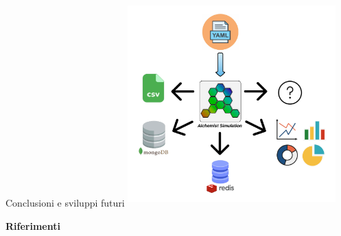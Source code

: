 \documentclass{beamer}
\begin{document}
\begin{frame}{Conclusioni e sviluppi futuri}
\hfil\hfil\includegraphics[width=8cm, height=8cm]{images/sviluppi_futuri.png}
\end{frame}

\begin{frame}{\textbf{Riferimenti}}
    \nocite{*}
    
    
\end{frame}

\end{document}
